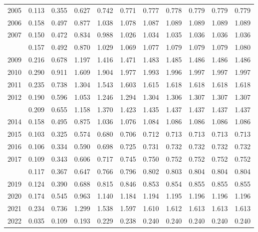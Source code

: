 \documentclass[
]{article}
\begin{document}
\begin{longtable}[t]{lrrrrrrrrrr}
2005 & 0.113 & 0.355 & 0.627 & 0.742 & 0.771 & 0.777 & 0.778 & 0.779 & 0.779 & 0.779\\
2006 & 0.158 & 0.497 & 0.877 & 1.038 & 1.078 & 1.087 & 1.089 & 1.089 & 1.089 & 1.089\\
2007 & 0.150 & 0.472 & 0.834 & 0.988 & 1.026 & 1.034 & 1.035 & 1.036 & 1.036 & 1.036\\
\addlinespace
2008 & 0.157 & 0.492 & 0.870 & 1.029 & 1.069 & 1.077 & 1.079 & 1.079 & 1.079 & 1.080\\
2009 & 0.216 & 0.678 & 1.197 & 1.416 & 1.471 & 1.483 & 1.485 & 1.486 & 1.486 & 1.486\\
2010 & 0.290 & 0.911 & 1.609 & 1.904 & 1.977 & 1.993 & 1.996 & 1.997 & 1.997 & 1.997\\
2011 & 0.235 & 0.738 & 1.304 & 1.543 & 1.603 & 1.615 & 1.618 & 1.618 & 1.618 & 1.618\\
2012 & 0.190 & 0.596 & 1.053 & 1.246 & 1.294 & 1.304 & 1.306 & 1.307 & 1.307 & 1.307\\
\addlinespace
2013 & 0.209 & 0.655 & 1.158 & 1.370 & 1.423 & 1.435 & 1.437 & 1.437 & 1.437 & 1.437\\
2014 & 0.158 & 0.495 & 0.875 & 1.036 & 1.076 & 1.084 & 1.086 & 1.086 & 1.086 & 1.086\\
2015 & 0.103 & 0.325 & 0.574 & 0.680 & 0.706 & 0.712 & 0.713 & 0.713 & 0.713 & 0.713\\
2016 & 0.106 & 0.334 & 0.590 & 0.698 & 0.725 & 0.731 & 0.732 & 0.732 & 0.732 & 0.732\\
2017 & 0.109 & 0.343 & 0.606 & 0.717 & 0.745 & 0.750 & 0.752 & 0.752 & 0.752 & 0.752\\
\addlinespace
2018 & 0.117 & 0.367 & 0.647 & 0.766 & 0.796 & 0.802 & 0.803 & 0.804 & 0.804 & 0.804\\
2019 & 0.124 & 0.390 & 0.688 & 0.815 & 0.846 & 0.853 & 0.854 & 0.855 & 0.855 & 0.855\\
2020 & 0.174 & 0.545 & 0.963 & 1.140 & 1.184 & 1.194 & 1.195 & 1.196 & 1.196 & 1.196\\
2021 & 0.234 & 0.736 & 1.299 & 1.538 & 1.597 & 1.610 & 1.612 & 1.613 & 1.613 & 1.613\\
2022 & 0.035 & 0.109 & 0.193 & 0.229 & 0.238 & 0.240 & 0.240 & 0.240 & 0.240 & 0.240\\*
\end{longtable}
\end{document}
